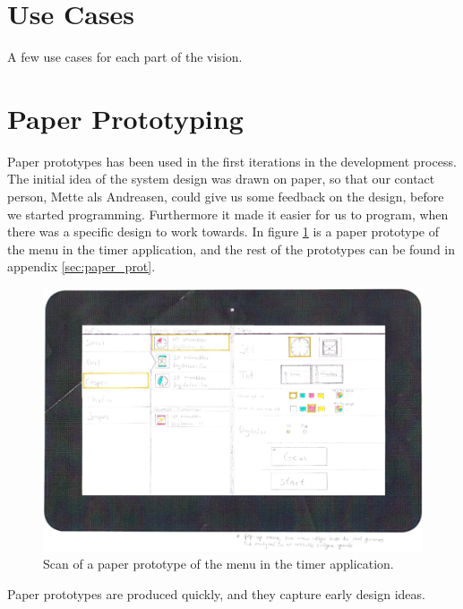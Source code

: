 \section{Use Cases}
A few use cases for each part of the vision.

\section{Paper Prototyping}
Paper prototypes\cite{misc:designInterSys} has been used in the first iterations in the development process. The initial idea of the system design was drawn on paper, so that our contact person, Mette als Andreasen, could give us some feedback on the design, before we started programming. Furthermore it made it easier for us to program, when there was a specific design to work towards. In figure \ref{fig:pap_prot_menu} is a paper prototype of the menu in the timer application, and the rest of the prototypes can be found in appendix \ref{sec:paper_prot}.

\begin{figure}[H]
	\centering
		\includegraphics[width=\textwidth]{Images/paper_prototype/menu.png}
			\caption{Scan of a paper prototype of the menu in the timer application.}
	\label{fig:pap_prot_menu}
\end{figure}

Paper prototypes are produced quickly, and they capture early design ideas.

